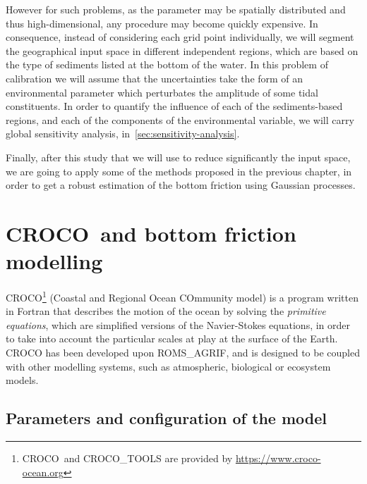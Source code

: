 \documentclass[../../Main_ManuscritThese.tex]{subfiles}
\newcommand{\CROCO}{CROCO}
\begin{document}
However for such problems, as the parameter may be spatially
distributed and thus high-dimensional, any procedure may become
quickly expensive.  In consequence, instead of considering each grid
point individually, we will segment the geographical input space in
different independent regions, which are based on the type of
sediments listed at the bottom of the water. In this problem of
calibration we will assume that the uncertainties take the form of an
environmental parameter which perturbates the amplitude of some tidal
constituents.  In order to quantify the influence of each of the
sediments-based regions, and each of the components of the
environmental variable, we will carry global sensitivity analysis,
in~\cref{sec:sensitivity-analysis}.

Finally, after this study that we will use to reduce significantly the
input space, we are going to apply some of the methods proposed in the
previous chapter, in order to get a robust estimation of the bottom
friction using Gaussian processes.



\section{\CROCO\ and bottom friction modelling}
\label{sec:croco_bottom_fr}
\CROCO{}\footnote{\CROCO\ and CROCO\_TOOLS are provided by
  \url{https://www.croco-ocean.org}} (Coastal and Regional Ocean
COmmunity model) is a program written in Fortran that describes the
motion of the ocean by solving the \emph{primitive equations}, which
are simplified versions of the Navier-Stokes equations, in order to
take into account the particular scales at play at the surface of the
Earth. \CROCO{} has been developed upon ROMS\_AGRIF, and is designed
to be coupled with other modelling systems, such as atmospheric,
biological or ecosystem models.



\subsection{Parameters and configuration of the model}
\label{sec:geographical_setting}
\end{document}
